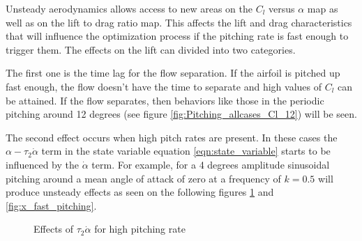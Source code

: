  \label{sub:unsteady_effects}
Unsteady aerodynamics allows access to new areas on the $C_l$ versus $\alpha$ map as well as on the lift to drag ratio map.
This affects the lift and drag characteristics that will influence the optimization process if the pitching rate is fast enough to trigger them.
The effects on the lift can divided into two categories.

\par The first one is the time lag for the flow separation. 
If the airfoil is pitched up fast enough, the flow doesn't have the time to separate and high values of $C_l$ can be attained.
If the flow separates, then behaviors like those in the periodic pitching around 12 degrees (see figure \ref{fig:Pitching_allcases_Cl_12}) will be seen.

\par The second effect occurs when high pitch rates are present.
In these cases the $\alpha - \tau_2 \dot{\alpha}$ term in the state variable equation \ref{eqn:state_variable} starts to be influenced by the $\dot{\alpha}$ term. 
For example, for a 4 degrees amplitude sinusoidal pitching around a mean angle of attack of zero at a frequency of $k=0.5$ will produce unsteady effects as seen on the following figures \ref{fig:alpha_dalpha_vs_t} and \ref{fig:x_fast_pitching}.

\begin{figure}[h]
  \centering
  \caption{Effects of $\tau_2 \dot{\alpha}$ for high pitching rate}
  \label{fig:alpha_dalpha_vs_t}
\end{figure}

